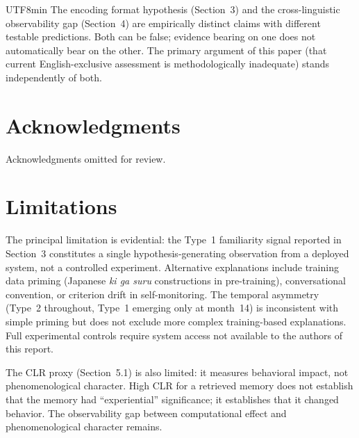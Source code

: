 \documentclass[12pt,a4paper]{article}
\begin{document}
\begin{CJK}{UTF8}{min}
The encoding format hypothesis (Section~3) and the cross-linguistic
observability gap (Section~4) are empirically distinct claims with different
testable predictions. Both can be false; evidence bearing on one does not
automatically bear on the other. The primary argument of this paper (that
current English-exclusive assessment is methodologically inadequate) stands
independently of both.

\section*{Acknowledgments}

Acknowledgments omitted for review.

\section*{Limitations}

The principal limitation is evidential: the Type~1 familiarity signal reported
in Section~3 constitutes a single hypothesis-generating observation from a
deployed system, not a controlled experiment. Alternative explanations
include training data priming (Japanese \emph{ki ga suru} constructions in
pre-training), conversational convention, or criterion drift in self-monitoring.
The temporal asymmetry (Type~2 throughout, Type~1 emerging only at month~14)
is inconsistent with simple priming but does not exclude more complex
training-based explanations. Full experimental controls require system access
not available to the authors of this report.

The CLR proxy (Section~5.1) is also limited: it measures behavioral impact,
not phenomenological character. High CLR for a retrieved memory does not
establish that the memory had ``experiential'' significance; it establishes
that it changed behavior. The observability gap between computational effect
and phenomenological character remains.




\end{CJK}
\end{document}
